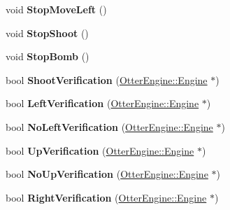 \begin{DoxyCompactItemize}
\item 
void {\bfseries Stop\+Move\+Left} ()\hypertarget{class_player_a286b84bba4db289ca4d0773006d525df}{}\label{class_player_a286b84bba4db289ca4d0773006d525df}

\item 
void {\bfseries Stop\+Shoot} ()\hypertarget{class_player_a6418fe49950ac402d8cdd588842a78d8}{}\label{class_player_a6418fe49950ac402d8cdd588842a78d8}

\item 
void {\bfseries Stop\+Bomb} ()\hypertarget{class_player_a086f2bfc41d78c22c59e680af186b0d4}{}\label{class_player_a086f2bfc41d78c22c59e680af186b0d4}

\item 
bool {\bfseries Shoot\+Verification} (\hyperlink{class_otter_engine_1_1_engine}{Otter\+Engine\+::\+Engine} $\ast$)\hypertarget{class_player_a41b366758084b559526966a0a287cb80}{}\label{class_player_a41b366758084b559526966a0a287cb80}

\item 
bool {\bfseries Left\+Verification} (\hyperlink{class_otter_engine_1_1_engine}{Otter\+Engine\+::\+Engine} $\ast$)\hypertarget{class_player_a42f77a183fda93b42121766589d82a5a}{}\label{class_player_a42f77a183fda93b42121766589d82a5a}

\item 
bool {\bfseries No\+Left\+Verification} (\hyperlink{class_otter_engine_1_1_engine}{Otter\+Engine\+::\+Engine} $\ast$)\hypertarget{class_player_a1e30e41c16364ab7f99b93a61c6e1e9b}{}\label{class_player_a1e30e41c16364ab7f99b93a61c6e1e9b}

\item 
bool {\bfseries Up\+Verification} (\hyperlink{class_otter_engine_1_1_engine}{Otter\+Engine\+::\+Engine} $\ast$)\hypertarget{class_player_a1f653977a580a6acfb0f192513120eff}{}\label{class_player_a1f653977a580a6acfb0f192513120eff}

\item 
bool {\bfseries No\+Up\+Verification} (\hyperlink{class_otter_engine_1_1_engine}{Otter\+Engine\+::\+Engine} $\ast$)\hypertarget{class_player_ab8ee0574993c3dc692e8f6094dd61c70}{}\label{class_player_ab8ee0574993c3dc692e8f6094dd61c70}

\item 
bool {\bfseries Right\+Verification} (\hyperlink{class_otter_engine_1_1_engine}{Otter\+Engine\+::\+Engine} $\ast$)\hypertarget{class_player_a17c645690279765e957f89f160a28e84}{}\label{class_player_a17c645690279765e957f89f160a28e84}


\end{DoxyCompactItemize}
